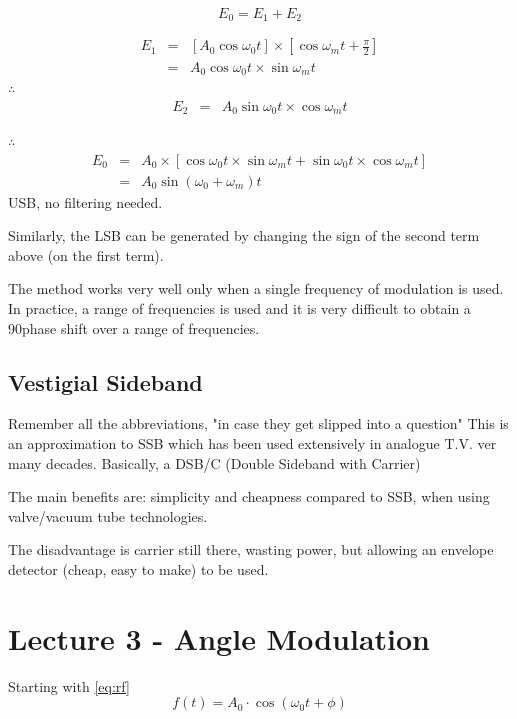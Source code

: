 \documentclass[11pt]{article} %
\begin{document}

\begin{equation}
E_0 = E_1+E_2
\end{equation}

\begin{eqnarray}
E_1 &=& \left[ A_0 \cos{\omega_0 t}\right] \times \left[ \cos{\omega_m t + \frac{\pi}{2}}\right]\nonumber \\
&=& A_0 \cos{\omega_0t}\times \sin{\omega_m t} 
\end{eqnarray}
$\therefore$
\begin{eqnarray}
E_2 &=& A_0 \sin{\omega_0t}\times \cos{\omega_m t}
\end{eqnarray}

$\therefore$
\begin{eqnarray}
E_0 &=& A_0 \times \left[\cos{\omega_0t}\times \sin{\omega_m t}+  \sin{\omega_0t}\times \cos{\omega_m t}\right] \nonumber \\
&=& A_0 \sin{\left(\omega_0 + \omega_m\right)} t
\end{eqnarray}
USB, no filtering needed.

Similarly, the LSB can be generated by changing the sign of the second term above (on the first term).

The method works very well only when a single frequency of modulation is used. In practice, a range of frequencies is used and it is very difficult to obtain a 90\textdegree phase shift over a range of frequencies.

\subsection{Vestigial Sideband}
Remember all the abbreviations, "in case they get slipped into a question"
This is an approximation to SSB which has been used extensively in analogue T.V. ver many decades. Basically, a DSB/C (Double Sideband with Carrier)


The main benefits are: simplicity and cheapness compared to SSB, when using valve/vacuum tube technologies.

The disadvantage is carrier still there, wasting power, but allowing an envelope detector (cheap, easy to make) to be used.

\section{Lecture 3 - Angle Modulation}
Starting with \ref{eq:rf}
\begin{equation}
f(t) = A_0 \cdot \cos\left(\omega_0t+\phi\right)
\end{equation}
\end{document}
